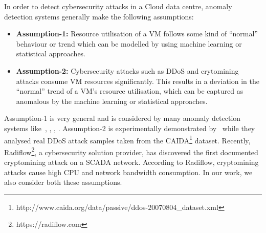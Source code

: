 \noindent In order to detect cybersecurity attacks in a Cloud data centre, anomaly detection systems generally make the following assumptions:
\begin{itemize} %
\item \textbf{Assumption-1:} Resource utilisation of a VM follows some kind of ``normal” behaviour or trend which can be modelled by using machine learning or statistical approaches.
\item \textbf{Assumption-2:} Cybersecurity attacks such as DDoS and crytomining attacks consume VM resources significantly. This results in a deviation in the ``normal” trend of a VM's resource utilisation, which can be captured as anomalous by the machine learning or statistical approaches.
\end{itemize} %

Assumption-1 is very general and is considered by many anomaly detection systems like~\cite{automated-detection:2016}, \cite{UBL:2012}, \cite{cloud-malware:2016}, \cite{EbAT:2010}. 
Assumption-2 is experimentally demonstrated by~\cite{ddso_charater_2017} while they analysed real DDoS attack samples taken from the CAIDA\footnote{http://www.caida.org/data/passive/ddos-20070804\_dataset.xml} dataset. 
Recently, Radiflow\footnote{https://radiflow.com}, a cybersecurity solution provider, has discovered the first documented cryptomining attack on a SCADA network. According to Radiflow, cryptomining attacks cause high CPU and network bandwidth consumption. 
In our work, we also consider both these assumptions.


